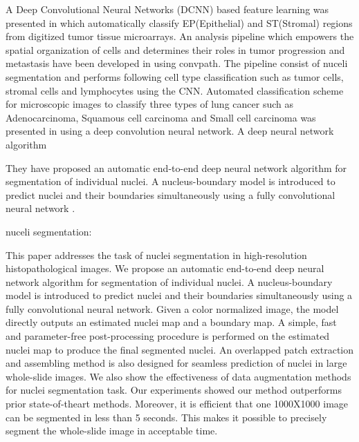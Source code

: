 \documentclass[conference]{IEEEtran}
\begin{document}
A Deep Convolutional Neural Networks (DCNN) based feature learning was presented in \cite{xu2016deep} which automatically classify EP(Epithelial) and ST(Stromal) regions from digitized tumor tissue microarrays. An analysis pipeline which empowers the  spatial organization of cells and determines their roles in tumor progression and metastasis have been developed in \cite{wang2019convpath} using convpath. The pipeline consist of nuceli  segmentation and performs following cell type classification such as tumor cells, stromal cells and lymphocytes using the CNN. Automated classification scheme for microscopic images to classify three types of lung cancer such as Adenocarcinoma, Squamous cell carcinoma and  Small cell carcinoma was presented in \cite{teramoto2017automated}  using a deep convolution neural network. A deep neural network algorithm 





They have proposed an automatic end-to-end deep neural network algorithm for segmentation of individual nuclei. A nucleus-boundary model is introduced to predict nuclei and their boundaries simultaneously using a fully convolutional neural network \cite{cui2019deep}. 

nuceli segmentation:


This paper addresses the task of nuclei segmentation
in high-resolution histopathological images. We propose an automatic end-to-end deep neural network algorithm for segmentation of individual nuclei. A nucleus-boundary model is introduced
to predict nuclei and their boundaries simultaneously using a
fully convolutional neural network. Given a color normalized
image, the model directly outputs an estimated nuclei map and a
boundary map. A simple, fast and parameter-free post-processing
procedure is performed on the estimated nuclei map to produce
the final segmented nuclei. An overlapped patch extraction and
assembling method is also designed for seamless prediction of
nuclei in large whole-slide images. We also show the effectiveness
of data augmentation methods for nuclei segmentation task. Our
experiments showed our method outperforms prior state-of-theart methods. Moreover, it is efficient that one 1000X1000 image
can be segmented in less than 5 seconds. This makes it possible
to precisely segment the whole-slide image in acceptable time.





\end{document}
